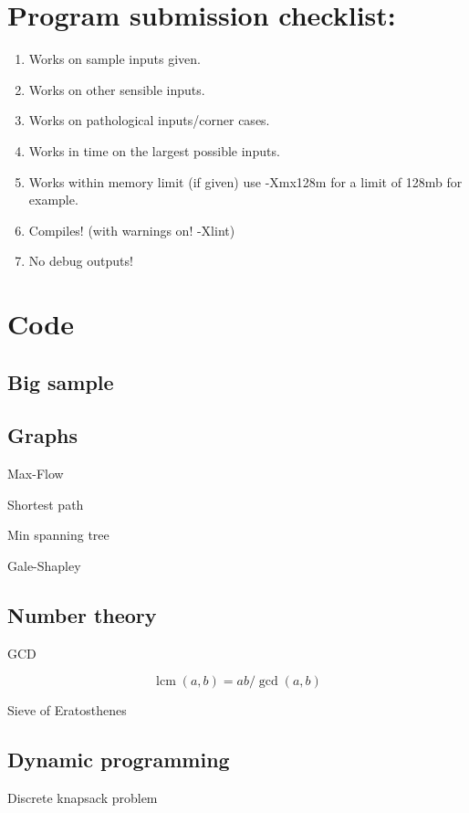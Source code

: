 \documentclass[10pt,a4paper]{article}
\newcommand{\codelisting}[1]{
  }
\DeclareMathOperator{\lcm}{lcm}
\begin{document}
\maketitle
\thispagestyle{myheadings}
\section*{Program submission checklist:}
\begin{enumerate}
\item Works on sample inputs given.
\item Works on other sensible inputs.
\item Works on pathological inputs/corner cases.
\item Works in time on the largest possible inputs.
\item Works within memory limit (if given) use -Xmx128m for a limit of 128mb for example.
\item Compiles! (with warnings on! -Xlint)
\item No debug outputs!
\end{enumerate}
\section*{Code}
\subsection*{Big sample}


\subsection*{Graphs}
\codelisting{Graph.java}

Max-Flow
\codelisting{fordfulkerson.java}

Shortest path
\codelisting{shortpath.java}

Min spanning tree
\codelisting{kruskal.java}

Gale-Shapley
\codelisting{galeshape.java}

\subsection*{Number theory}
GCD
\codelisting{gcd.java}
\[\lcm(a,b) = ab/\gcd(a,b)\]

Sieve of Eratosthenes
\codelisting{seive.java}

\subsection*{Dynamic programming}
Discrete knapsack problem
\codelisting{knapsack.java}
\end{document}
